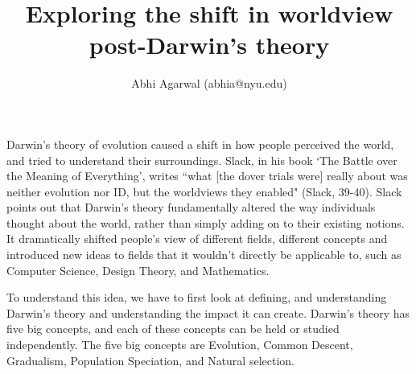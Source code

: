 \documentclass[11pt, oneside]{article}
\title{Exploring the shift in worldview post-Darwin's theory}
\author{Abhi Agarwal (abhia@nyu.edu)}
\date{}
\begin{document}
\maketitle



\par Darwin's theory of evolution caused a shift in how people perceived the world, and tried to understand their surroundings. Slack, in his book `The Battle over the Meaning of Everything', writes ``what [the dover trials were] really about was neither evolution nor ID, but the worldviews they enabled" (Slack, 39-40). Slack points out that Darwin's theory fundamentally altered the way individuals thought about the world, rather than simply adding on to their existing notions. It dramatically shifted people's view of different fields, different concepts and introduced new ideas to fields that it wouldn't directly be applicable to, such as Computer Science, Design Theory, and Mathematics. 


\par To understand this idea, we have to first look at defining, and understanding Darwin's theory and understanding the impact it can create. Darwin's theory has five big concepts, and each of these concepts can be held or studied independently. The five big concepts are Evolution, Common Descent, Gradualism, Population Speciation, and Natural selection. 
\end{document}
